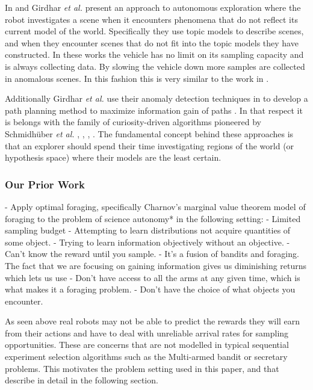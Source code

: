 In \cite{girdhar2013autonomous} and \cite{girdhar2013Aautonomous} Girdhar
\emph{et al.} present an approach to autonomous exploration where the robot
investigates a scene when it encounters phenomena that do not reflect its
current model of the world.  Specifically they use topic models to describe
scenes, and when they encounter scenes that do not fit into the topic models
they have constructed.  In these works the vehicle has no limit on its sampling
capacity and is always collecting data.  By slowing the vehicle down more
samples are collected in anomalous scenes.  In this fashion this is very
similar to the work in \cite{thompson2013adaptive}.

Additionally Girdhar \emph{et al.} use their anomaly detection techniques in
\cite{girdhar2013autonomous} to develop a path planning method to maximize
information gain of paths \cite{girdhar2014curiosity}.  In that respect it is
belongs with the family of curiosity-driven algorithms pioneered by
Schmidh{\"u}ber \emph{et al.} \cite{schmidhuber1997what},
\cite{schmidhuber2003exploring}, \cite{schmidhuber2009simple},
\cite{sun2011planning}.  The fundamental concept behind these approaches is
that an explorer should spend their time investigating regions of the world (or
hypothesis space) where their models are the least certain.

\subsubsection{Our Prior Work}
		- Apply optimal foraging, specifically Charnov's marginal value theorem
		model of foraging to the problem of science autonomy* in the following setting:	
			- Limited sampling budget
			- Attempting to learn distributions not acquire quantities of some object.
			- Trying to learn information objectively without an objective. 
			- Can't know the reward until you sample.
			- It's a fusion of bandits and foraging.  The fact that we are focusing on gaining information gives us diminishing returns which lets us use 
			- Don't have access to all the arms at any given time, which is what makes it a foraging problem.
			- Don't have the choice of what objects you encounter.

As seen above real robots may not be able to predict the rewards they will earn from their actions and have to deal with unreliable arrival rates for sampling opportunities.  These are concerns that are not modelled in typical sequential experiment selection algorithms such as the Multi-armed bandit or secretary problems.  This motivates the problem setting used in this paper, and that describe in detail in the following section.
